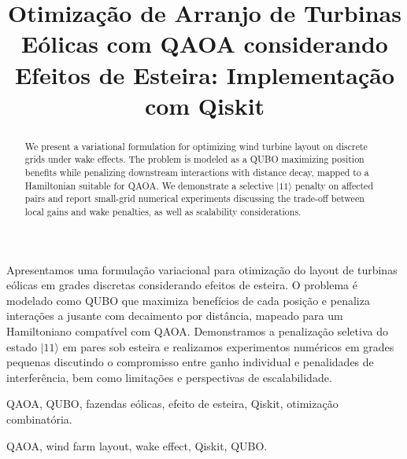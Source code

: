 \documentclass{weciq}
\begin{document}
\newcommand{\weciqwcq}{VIII $\left<\right.$WECIQ$|$WCQ$\left.\right>$}

\title{Otimização de Arranjo de Turbinas Eólicas com QAOA considerando Efeitos de Esteira: Implementação com Qiskit}


\maketitle



\begin{resumo}
Apresentamos uma formulação variacional para otimização do layout de turbinas eólicas em grades discretas considerando efeitos de esteira. O problema é modelado como QUBO que maximiza benefícios de cada posição e penaliza interações a jusante com decaimento por distância, mapeado para um Hamiltoniano compatível com QAOA. Demonstramos a penalização seletiva do estado $|11\rangle$ em pares sob esteira e realizamos experimentos numéricos em grades pequenas discutindo o compromisso entre ganho individual e penalidades de interferência, bem como limitações e perspectivas de escalabilidade.
\end{resumo}
\begin{chave}
QAOA, QUBO, fazendas eólicas, efeito de esteira, Qiskit, otimização combinatória.
\end{chave}


\begin{abstract}
We present a variational formulation for optimizing wind turbine layout on discrete grids under wake effects. The problem is modeled as a QUBO maximizing position benefits while penalizing downstream interactions with distance decay, mapped to a Hamiltonian suitable for QAOA. We demonstrate a selective $|11\rangle$ penalty on affected pairs and report small-grid numerical experiments discussing the trade-off between local gains and wake penalties, as well as scalability considerations.
\end{abstract}
\begin{keywords}
QAOA, wind farm layout, wake effect, Qiskit, QUBO.
\end{keywords}
\end{document}
